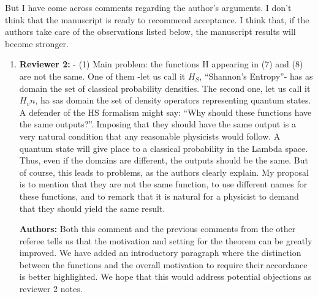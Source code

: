 \documentclass[11pt, executivepaper]{article}
\begin{document}
But I have come across comments regarding the author’s arguments. I don’t think that the manuscript is ready to recommend acceptance. I think that, if the authors take care of the observations listed below, the manuscript results will become stronger.

\begin{enumerate}
	\item \textbf{Reviewer 2:} - (1)    Main problem: the functions H appearing in (7) and (8) are not the same. One of them -let us call it $H_S$, “Shannon’s Entropy”- has as domain the set of classical probability densities. The second one, let us call it $H_vn$, ha sas domain the set of density operators representing quantum states. A defender of the HS formalism might say: “Why should these functions have the same outputs?”. Imposing that they should have the same output is a very natural condition that any reasonable physicists would follow. A quantum state will give place to a classical probability in the Lambda space. Thus, even if the domains are different, the outputs should be the same. But of course, this leads to problems, as the authors clearly explain. My proposal is to mention that they are not the same function, to use different names for these functions, and to remark that it is natural for a physicist to demand that they should yield the same result.  
	\vspace{2mm}
	
	\textbf{Authors:} Both this comment and the previous comments from the other referee tells us that the motivation and setting for the theorem can be greatly improved. We have added an introductory paragraph where the distinction between the functions and the overall motivation to require their accordance is better highlighted. We hope that this would address potential objections as reviewer 2 notes.
	

\end{enumerate}
\end{document}
